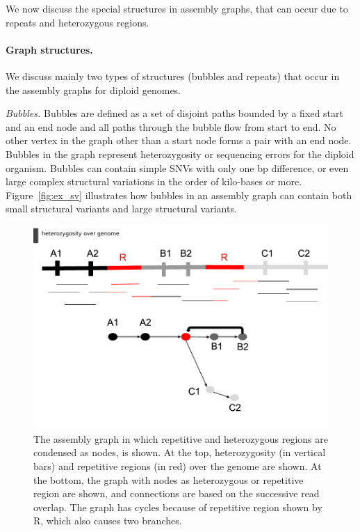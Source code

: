We now discuss the special structures in assembly graphs, that can occur due to repeats and heterozygous regions.

\paragraph{Graph structures.} We discuss mainly two types of structures (bubbles and repeats) that occur in the assembly graphs for diploid genomes.

\textit{Bubbles.}
Bubbles are defined as a set of disjoint paths bounded by a fixed start and an end node and all paths through the bubble flow from start to end. 
No other vertex in the graph other than a start node forms a pair with an end node.
Bubbles in the graph represent heterozygosity or sequencing errors for the diploid organism.
Bubbles can contain simple SNVs with only one bp difference, or even large complex structural variations in the order of kilo-bases or more.  
Figure~\ref{fig:ex_sv} illustrates how bubbles in an assembly graph can contain both small structural variants and large structural variants.
\begin{figure}[t!]\centering
\includegraphics[width=\columnwidth]{repeats.pdf}
\caption{The assembly graph in which repetitive and heterozygous regions are condensed as nodes, is shown. 
At the top, heterozygosity (in vertical bars) and repetitive regions (in red) over the genome are shown. 
At the bottom, the graph with nodes as heterozygous or repetitive region are shown, and connections are based on the successive read overlap.
The graph has cycles because of repetitive region shown by R, which also causes two branches.}
\label{fig:repeats}
\end{figure}

